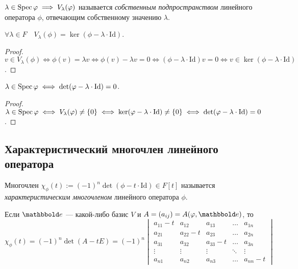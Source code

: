 \begin{definition}
    $\lambda \in \operatorname{\mathop{\mathrm{Spec}}} \varphi \implies V_\lambda(\varphi)$ называется \textit{собственным подпространством} линейного оператора $\phi$, отвечающим собственному значению $\lambda$.
\end{definition}

\begin{comment}
    $V_\lambda(\phi) \ \phi$-нивариантно, $\quad \phi\Big|_{V_{\lambda}(\phi)} = \lambda \cdot \mathrm{Id}\Big|_{V_\lambda(\phi)}$.
\end{comment}

\begin{proposal}
    $\forall \lambda \in F \quad V_\lambda(\phi) = \ker(\phi - \lambda \cdot \mathrm{Id})$.
\end{proposal}

\begin{proof}
    $v \in V_\lambda(\phi) \iff \phi(v) = \lambda v \iff \phi(v) - \lambda v = 0 \iff (\phi - \lambda \cdot \mathrm{Id}) v = 0 \iff v \in \ker(\phi - \lambda \cdot \mathrm{Id})$.
\end{proof}

\begin{corollary}
    $\lambda \in \operatorname{\mathop{\mathrm{Spec}}} \varphi \iff \det (\varphi - \lambda \cdot \mathrm{Id}) = 0$.
\end{corollary}

\begin{proof}
    $\lambda \in \operatorname{\mathop{\mathrm{Spec}}} \varphi \iff V_\lambda(\varphi) \neq \{0\} \iff \ker(\varphi - \lambda \cdot \mathrm{Id}) \neq \{0\} \iff \det(\varphi - \lambda \cdot \mathrm{Id}) = 0$.
\end{proof}

\subsection{Характеристический многочлен линейного оператора}

\begin{definition}
    Многочлен $\chi_\phi(t) := (-1)^n \det(\phi - t \cdot \mathrm{Id}) \in F[t]$ называется \textit{характеристическим многочленом} линейного оператора $\phi$.
\end{definition}

Если $\E$ --- какой-либо базис $V$ и $A = (a_{ij}) = A(\phi, \E)$, то
\begin{equation*}
    \chi_\phi(t) = (-1)^n \det (A - tE) = (-1)^n \begin{vmatrix} 
        a_{11} - t & a_{12} & a_{13} & \dots & a_{1n} \\ 
        a_{21} & a_{22} - t & a_{23} & \dots & a_{2n} \\
        a_{31} & a_{32} & a_{33} - t & \dots & a_{3n} \\
        \vdots & \vdots & \vdots & \ddots & \vdots \\
        a_{n1} & a_{n2} & a_{n3} & \dots & a_{nn} - t
    \end{vmatrix}
\end{equation*}

